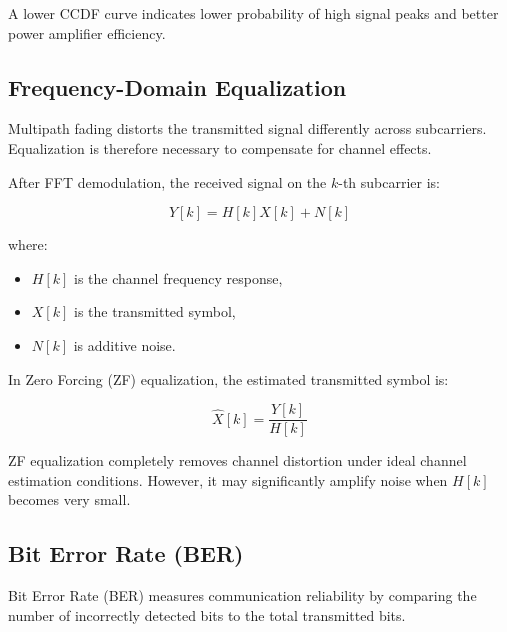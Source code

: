 A lower CCDF curve indicates lower probability of high signal peaks and
better power amplifier efficiency.

\subsection{Frequency-Domain Equalization}

Multipath fading distorts the transmitted signal differently across
subcarriers. Equalization is therefore necessary to compensate for channel
effects.

After FFT demodulation, the received signal on the $k$-th subcarrier is:

\begin{equation}
Y[k]=H[k]X[k]+N[k]
\end{equation}

where:
\begin{itemize}
    \item $H[k]$ is the channel frequency response,
    \item $X[k]$ is the transmitted symbol,
    \item $N[k]$ is additive noise.
\end{itemize}

In Zero Forcing (ZF) equalization, the estimated transmitted symbol is:

\begin{equation}
\hat{X}[k]=\frac{Y[k]}{H[k]}
\end{equation}

ZF equalization completely removes channel distortion under ideal channel
estimation conditions. However, it may significantly amplify noise when
$H[k]$ becomes very small.

\vspace{0.3cm}


\subsection{Bit Error Rate (BER)}

Bit Error Rate (BER) measures communication reliability by comparing the
number of incorrectly detected bits to the total transmitted bits.

